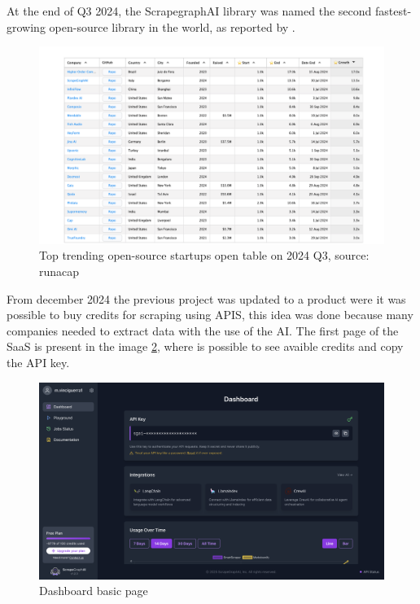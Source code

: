 At the end of Q3 2024, the ScrapegraphAI  library was named the second fastest-growing open-source library in the world, as reported by \cite{runacap2024}.

\begin{figure}[h!]
    \centering
    \includegraphics[width=0.95\linewidth]{Assets/growing_companies.png}
    \caption{Top trending open-source startups open table on 2024 Q3, source: runacap}
    \label{fig:enter-label}

\end{figure}

From december 2024 the previous project was updated to a product were it was possible to buy credits for scraping using APIS, this idea was done because many companies needed to extract data with the use of the AI.
The  first page of the SaaS is present in the image \ref{fig:enter-dashboard-basi}, where is possible to see avaible credits and copy the API key.
\begin{figure}[h!]
    \centering
    \includegraphics[width=0.95\linewidth]{Assets/dashboard_1.png}
    \caption{Dashboard basic page}
    \label{fig:enter-dashboard-basi}
\end{figure}

